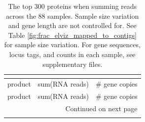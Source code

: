 \begin{singlespace}
\begin{longtable}{p{} cc}
\caption[Highest expressed proteins, across samples]{
	The top 300 proteins when summing reads across the 88 samples.
    Sample size variation and gene length are not controlled for.
    See Table \ref{fig:frac_elviz_mapped_to_contigs} for sample size variation.
    For gene sequences, locus tags, and counts in each sample, see supplementary files.  %
    } \\  %
\label{table:top_genes} \\  %
\toprule
                                           product & sum(RNA reads) & \# gene copies \\
\midrule \endfirsthead
\toprule
                                           product & sum(RNA reads) & \# gene copies \\
\midrule

\endhead
\midrule
\multicolumn{3}{r}{{Continued on next page}} \\
\midrule
\endfoot


\end{longtable}
\end{singlespace}

